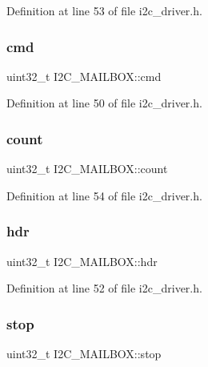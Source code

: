 Definition at line 53 of file i2c\+\_\+driver.\+h.

\mbox{\label{structI2C__MAILBOX_af89f3b197a3aeb8c2869c9dd39ffa378}} 
\subsubsection{\texorpdfstring{cmd}{cmd}}
{\footnotesize\ttfamily uint32\+\_\+t I2\+C\+\_\+\+M\+A\+I\+L\+B\+O\+X\+::cmd}



Definition at line 50 of file i2c\+\_\+driver.\+h.

\mbox{\label{structI2C__MAILBOX_ac228c1b2e5d0e1f4bc81aea46df398b1}} 
\subsubsection{\texorpdfstring{count}{count}}
{\footnotesize\ttfamily uint32\+\_\+t I2\+C\+\_\+\+M\+A\+I\+L\+B\+O\+X\+::count}



Definition at line 54 of file i2c\+\_\+driver.\+h.

\mbox{\label{structI2C__MAILBOX_a84afe54cdce2b852d0c22d1b17e7fdc2}} 
\subsubsection{\texorpdfstring{hdr}{hdr}}
{\footnotesize\ttfamily uint32\+\_\+t I2\+C\+\_\+\+M\+A\+I\+L\+B\+O\+X\+::hdr}



Definition at line 52 of file i2c\+\_\+driver.\+h.

\mbox{\label{structI2C__MAILBOX_a7e1a620eee1be9c9745ebf836294570e}} 
\subsubsection{\texorpdfstring{stop}{stop}}
{\footnotesize\ttfamily uint32\+\_\+t I2\+C\+\_\+\+M\+A\+I\+L\+B\+O\+X\+::stop}



